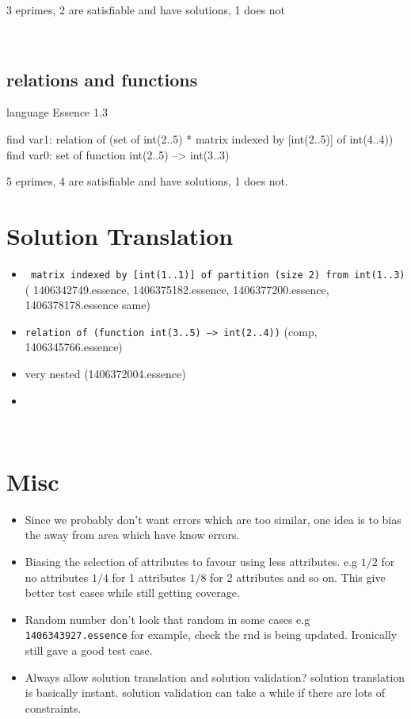 3 eprimes,  2 are satisfiable and have solutions, 1 does not 

\ \\\subsection{relations and functions}

\begin{lst:essence}[caption=1406371836.essence]
language Essence 1.3

find var1:
        relation of (set of int(2..5) * matrix indexed by [int(2..5)] of int(4..4))
find var0: set of function int(2..5) --> int(3..3)

\end{lst:essence}

5 eprimes, 4 are satisfiable and have solutions, 1 does not.

\section{Solution Translation}

\begin{itemize}
	\item \texttt{ matrix indexed by [int(1..1)] of partition (size 2) from int(1..3)} ( 1406342749.essence, 1406375182.essence, 1406377200.essence, 1406378178.essence same)
	\item \texttt{relation of (function int(3..5) --> int(2..4))}  (comp, 1406345766.essence)
	\item very nested (1406372004.essence)
	\item 
\end{itemize}

\ \\\section{Misc}

\begin{itemize}
	\item Since we probably don't want errors which are too similar, one idea is to bias the away from area which have know errors.
	\item Biasing the selection of attributes to favour using less attributes. e.g $1/2$ for no attributes $1/4$ for 1 attributes $1/8$ for 2 attributes and so on. This give better test cases while still getting coverage.
	\item Random number don't look that random in some cases e.g \texttt{1406343927.essence} for example, check the rnd is being updated. Ironically still gave a good test case.
	\item Always allow solution translation and solution validation?  solution translation is basically instant. solution validation can take a while if there are lots of constraints.  
\end{itemize}




